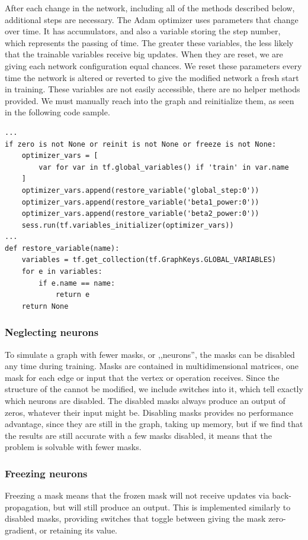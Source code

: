 \documentclass[12pt]{report}
\begin{document}
After each change in the network, including all of the methods described below, additional steps are necessary. The Adam \cite{adam} optimizer uses parameters that change over time. It has accumulators, and also a variable storing the step number, which represents the passing of time. The greater these variables, the less likely that the trainable variables receive big updates. When they are reset, we are giving each network configuration equal chances. We reset these parameters every time the network is altered or reverted to give the modified network a fresh start in training. These variables are not easily accessible, there are no helper methods provided. We must manually reach into the graph and reinitialize them, as seen in the following code sample.
\begin{center}
	\begin{minipage}{0.95\textwidth}
		\begin{lstlisting}[title=fcn\_train.py]
...
if zero is not None or reinit is not None or freeze is not None:
	optimizer_vars = [
		var for var in tf.global_variables() if 'train' in var.name
	]
	optimizer_vars.append(restore_variable('global_step:0'))
	optimizer_vars.append(restore_variable('beta1_power:0'))
	optimizer_vars.append(restore_variable('beta2_power:0'))
	sess.run(tf.variables_initializer(optimizer_vars))
...
def restore_variable(name):
	variables = tf.get_collection(tf.GraphKeys.GLOBAL_VARIABLES)
	for e in variables:
		if e.name == name:
			return e
	return None
		\end{lstlisting}
	\end{minipage}
\end{center}


\subsubsection{Neglecting neurons}
To simulate a graph with fewer masks, or ,,neurons'', the masks can be disabled any time during training. Masks are contained in multidimensional matrices, one mask for each edge or input that the vertex or operation receives. Since the structure of the cannot be modified, we include switches into it, which tell exactly which neurons are disabled. The disabled masks always produce an output of zeros, whatever their input might be. Disabling masks provides no performance advantage, since they are still in the graph, taking up memory, but if we find that the results are still accurate with a few masks disabled, it means that the problem is solvable with fewer masks.
\subsubsection{Freezing neurons}
Freezing a mask means that the frozen mask will not receive updates via back-propagation, but will still produce an output. This is implemented similarly to disabled masks, providing switches that toggle between giving the mask zero-gradient, or retaining its value.
\end{document}
